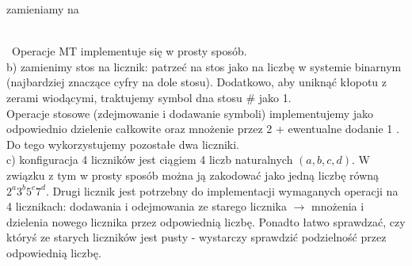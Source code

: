 \documentclass[a4paper,11pt]{article}
\begin{document}
zamieniamy na \\

\\\
Operacje MT implementuje się w prosty sposób. \\
b) zamienimy stos na licznik: patrzeć na stos jako na liczbę w systemie binarnym (najbardziej
znaczące cyfry na dole stosu). Dodatkowo, aby uniknąć kłopotu z zerami wiodącymi, traktujemy symbol dna stosu $\#$ jako 1.\\
Operacje stosowe (zdejmowanie i dodawanie symboli) implementujemy jako odpowiednio 
dzielenie całkowite oraz mnożenie przez 2 + ewentualne dodanie 1 . Do tego wykorzystujemy pozostałe dwa liczniki. \\
c) konfiguracja 4 liczników jest ciągiem 4 liczb naturalnych $(a,b,c,d)$. W związku z tym w prosty sposób można ją zakodować
jako jedną liczbę równą $2^a3^b5^c7^d$. Drugi licznik jest potrzebny do implementacji wymaganych operacji na 4 licznikach:
dodawania i odejmowania ze starego licznika $\longrightarrow$ mnożenia i dzielenia nowego licznika przez odpowiednią liczbę. 
Ponadto łatwo sprawdzać, czy któryś ze starych liczników jest pusty - wystarczy sprawdzić podzielność przez odpowiednią liczbę. \\ 
\end{document}
